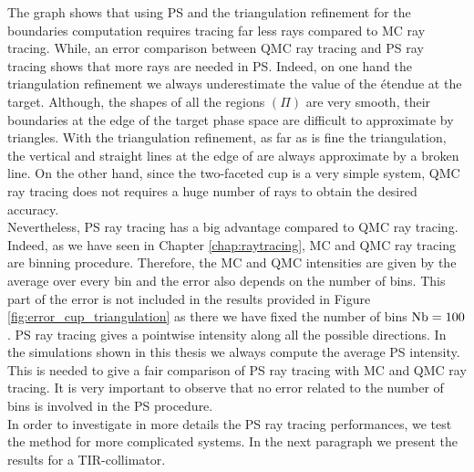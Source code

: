 The graph shows that using PS and the triangulation refinement for the boundaries computation requires tracing far less rays compared to MC ray tracing.
While, an error comparison between QMC ray tracing and PS ray tracing shows that more rays are needed in PS. Indeed, on one hand the triangulation refinement we always underestimate the value of the \'{e}tendue at the target. Although, the shapes of all the regions $(\Pi)$ are very smooth, their boundaries at the edge of the target phase space  are difficult to approximate by triangles. With the triangulation refinement, as far as is fine the triangulation, the vertical and straight lines at the edge of  are always approximate by a broken line. On the other hand, since the two-faceted cup is a very simple system, QMC ray tracing does not requires a huge number of rays to obtain the desired accuracy. \\ \indent Nevertheless, PS ray tracing has a big advantage compared to QMC ray tracing. Indeed, as we have seen in Chapter \ref{chap:raytracing}, MC and QMC ray tracing are binning procedure. Therefore, the MC and QMC intensities are given by the average over every bin and the error also depends on the number of bins. This part of the error is not included in the results provided in Figure \ref{fig:error_cup_triangulation} as there we have fixed the number of bins $\textrm{Nb} = 100$. %
PS ray tracing gives a pointwise intensity along all the possible directions. In the simulations shown in this thesis we always compute the average PS intensity. This is needed to give a fair comparison of PS ray tracing with MC and QMC ray tracing. It is very important to observe that no error related to the number of bins is involved in the PS procedure. \\ \indent
In order to investigate in more details the PS ray tracing performances, we test the method for more complicated systems. In the next paragraph we present the results for a TIR-collimator. 
